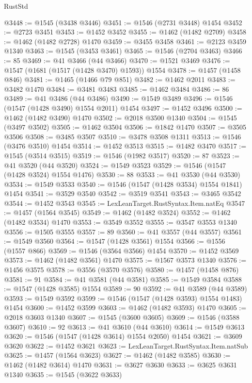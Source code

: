 \begin{lexlean}{RustStd}
\begin{coremodule}
{\begin{coremodule}
{{{{{{{{{{{{{{{{{{{{{{{{{{{{{{@3448 := @1545 (@3438 @3446)
@3451 := @1546 (@2731 @3448) @1454
@3452 := @2723 @3451
@3453 := @1452 @3452
@3455 := @1462 (@1482 @2709)
@3458 := @1462 (@1482 @2728) @1470
@3459 := @3455 @3458
@3461 := @2123 @3459 @1340
@3463 := @1545 (@3453 @3461)
@3465 := @1546 (@2704 @3463)
@3466 := 85
@3469 := @41 @3466 (@44 @3466)
@3470 := @1521 @3469
@3476 := @1547 (@1681 (@1517 (@1428 @3470) @1593)) @1554
@3478 := @1457 (@1458 @846)
@3481 := @1465 (@1466 @79 @851)
@3482 := @1462 @2011
@3483 := @3482 @1470
@3484 := @3481 @3483
@3485 := @1462 @3484
@3486 := 86
@3489 := @41 @3486 (@44 @3486)
@3490 := @1549 @3489
@3496 := @1546 (@1547 (@1428 @3490) @1554 @2011) @1454
@3497 := @1452 @3496
@3500 := @1462 (@1482 @3490) @1470
@3502 := @2018 @3500 @1340
@3504 := @1545 (@3497 @3502)
@3505 := @1462 @3504
@3506 := @1842 @1470
@3507 := @3505 @3506
@3508 := @3485 @3507
@3510 := @3478 @3508 @1311
@3513 := @1546 (@3476 @3510) @1454
@3514 := @1452 @3513
@3515 := @1482 @3470
@3517 := @1545 (@3514 @3515)
@3519 := @1546 (@1982 @3517)
@3520 := 87
@3523 := @41 @3520 (@44 @3520)
@3524 := @1549 @3523
@3529 := @1546 (@1547 (@1428 @3524) @1554 @1476)
@3530 := 88
@3533 := @41 @3530 (@44 @3530)
@3534 := @1549 @3533
@3540 := @1546 (@1547 (@1428 @3534) @1554 @1841) @1454
@3541 := @3529 @3540
@3542 := @3519 @3541
@3543 := @3465 @3542
@3544 := @1452 @3543
@3545 := LexLeanTarget.RustSyntax.Item.natEq
@3547 := @1457 (@1564 @3545)
@3549 := @1462 (@1482 @3524)
@3552 := @1462 (@1482 @3534) @1470
@3553 := @3549 @3552
@3555 := @3547 @3553 @1340
@3556 := @1505 @3555
@3557 := 89
@3560 := @41 @3557 (@44 @3557)
@3561 := @1549 @3560
@3564 := @1547 (@1428 @3561) @1554
@3566 := @1556 (@1557 @866)
@3569 := @1546 (@3564 @3566) @1454
@3570 := @1452 @3569
@3573 := @1462 (@1482 @3561) @1470
@3575 := @1567 @3573 @1340
@3576 := @1456 @3575
@3578 := @3556 (@3570 @3576)
@3580 := @1457 (@1458 @876)
@3581 := 91
@3584 := @41 @3581 (@44 @3581)
@3585 := @1549 @3584
@3588 := @1547 (@1428 @3585) @1554
@3589 := 90
@3592 := @41 @3589 (@44 @3589)
@3593 := @1549 @3592
@3599 := @1546 (@1547 (@1428 @3593) @1554 @1483) @1454
@3600 := @1452 @3599
@3603 := @1462 (@1482 @3593) @1470
@3605 := @2018 @3603 @1340
@3607 := @1545 (@3600 @3605)
@3609 := @1546 (@3588 @3607)
@3610 := 92
@3613 := @41 @3610 (@44 @3610)
@3614 := @1549 @3613
@3620 := @1546 (@1547 (@1428 @3614) @1554 @2050) @1454
@3621 := @3609 @3620
@3622 := @1452 @3621
@3623 := LexLeanTarget.RustSyntax.Item.natSub
@3625 := @1457 (@1564 @3623)
@3627 := @1462 (@1482 @3585)
@3630 := @1462 (@1482 @3614) @1470
@3631 := @3627 @3630
@3633 := @3625 @3631 @1340
@3635 := @1545 (@3622 @3633)
}}}}}}}}}}}}}}}}}}}}}}}}}}}}}}
\end{coremodule}}
\end{coremodule}
\end{lexlean}
